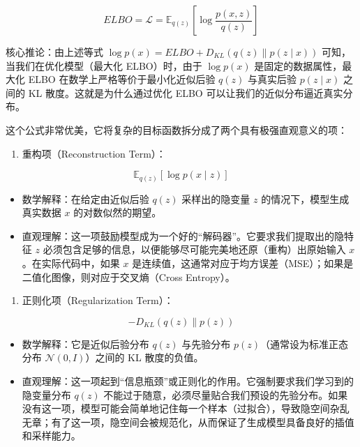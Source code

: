 \[
ELBO=\mathcal{L}=\mathbb{E}_{q(z)}\left[\log\frac{p(x,z)}{q(z)}\right]
\]

核心推论：由上述等式 \(\log p(x)=ELBO+D_{KL}(q(z)\parallel p(z\mid x))\) 可知，当我们在优化模型（最大化 ELBO）时，由于 \(\log p(x)\) 是固定的数据属性，最大化 ELBO 在数学上严格等价于最小化近似后验 \(q(z)\) 与真实后验 \(p(z\mid x)\) 之间的 KL 散度。这就是为什么通过优化 ELBO 可以让我们的近似分布逼近真实分布。

这个公式非常优美，它将复杂的目标函数拆分成了两个具有极强直观意义的项：

\begin{enumerate}
\def\labelenumi{\arabic{enumi}.}
\tightlist
\item
  重构项（Reconstruction Term）：
\end{enumerate}

\[
\mathbb{E}_{q(z)}[\log p(x \mid z)]
\]

\begin{itemize}
\tightlist
\item
  数学解释：在给定由近似后验 \(q(z)\) 采样出的隐变量 \(z\) 的情况下，模型生成真实数据 \(x\) 的对数似然的期望。
\item
  直观理解：这一项鼓励模型成为一个好的``解码器''。它要求我们提取出的隐特征 \(z\) 必须包含足够的信息，以便能够尽可能完美地还原（重构）出原始输入 \(x\)。在实际代码中，如果 \(x\) 是连续值，这通常对应于均方误差（MSE）；如果是二值化图像，则对应于交叉熵（Cross Entropy）。
\end{itemize}

\begin{enumerate}
\def\labelenumi{\arabic{enumi}.}
\setcounter{enumi}{1}
\tightlist
\item
  正则化项（Regularization Term）：
\end{enumerate}

\[
- D_{KL}(q(z)\parallel p(z))
\]

\begin{itemize}
\tightlist
\item
  数学解释：它是近似后验分布 \(q(z)\) 与先验分布 \(p(z)\)（通常设为标准正态分布 \(\mathcal{N}(0, I)\)）之间的 KL 散度的负值。
\item
  直观理解：这一项起到``信息瓶颈''或正则化的作用。它强制要求我们学习到的隐变量分布 \(q(z)\) 不能过于随意，必须尽量贴合我们预设的先验分布。如果没有这一项，模型可能会简单地记住每一个样本（过拟合），导致隐空间杂乱无章；有了这一项，隐空间会被规范化，从而保证了生成模型具备良好的插值和采样能力。
\end{itemize}

